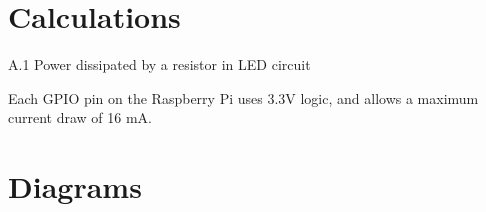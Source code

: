 \documentclass[12pt]{report}
\begin{document}
\chapter{Calculations} \label{appendix:calculations}

A.1 Power dissipated by a resistor in LED circuit

Each GPIO pin on the Raspberry Pi uses 3.3V logic, and allows a maximum current draw of 16 mA. 


\chapter{Diagrams} \label{appendix:diagrams}
\end{document}
